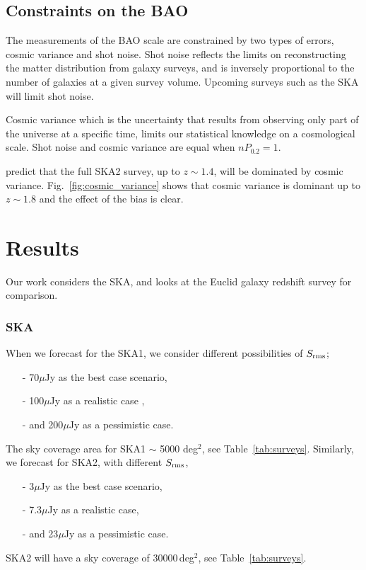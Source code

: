 \documentclass[useAMS,usenatbib]{mn2e}
\begin{document}
\subsection{Constraints on the BAO}
The measurements of the BAO scale are constrained by  two types of errors,  cosmic variance and  shot noise. Shot noise reflects the limits on reconstructing the matter distribution from galaxy surveys,  and  is  inversely proportional to the number of galaxies at a given survey volume. Upcoming surveys such as the SKA will limit shot noise. 


Cosmic variance which is the uncertainty that results from observing only part of the universe at a specific time,  limits our statistical knowledge on a cosmological scale. Shot noise and cosmic variance are equal when $n P_{0.2} = 1$.

\cite{Abdalla:2009wr} predict that the  full SKA2 survey, up  to $z \sim 1.4$, will be dominated  by cosmic variance.  Fig.~\ref{fig:cosmic_variance} shows that  cosmic variance is dominant  up to $z\sim 1.8$ and the effect of the bias is clear.


\section{Results}
Our work considers the SKA, and looks at the  Euclid galaxy redshift  survey  for comparison. 
\subsubsection{SKA}\label{SKA}
When we forecast for the SKA1, we consider different possibilities of  $S_{\rm rms}$;
\begin{itemize}
\item[-] 70$\mu $Jy as the best case scenario,
\item[-] 100$\mu $Jy as a realistic case  , 
\item[-]  and 200$\mu$Jy  as a pessimistic case. 
\end{itemize}
The sky coverage area for SKA1 $\sim$ 5000 deg$^2$, see Table~\ref{tab:surveys}.
Similarly, we forecast  for  SKA2,  with different $S_{\rm rms}$,
\begin{itemize}
\item[-]  3$\mu $Jy as the best case scenario, 
\item[-]  7.3$\mu $Jy as a realistic case,
\item[-]  and 23$\mu $Jy as a pessimistic case.
\end{itemize}
SKA2 will have a sky coverage of $30000\,$deg$^2$, see Table~\ref{tab:surveys}. 
\end{document}
